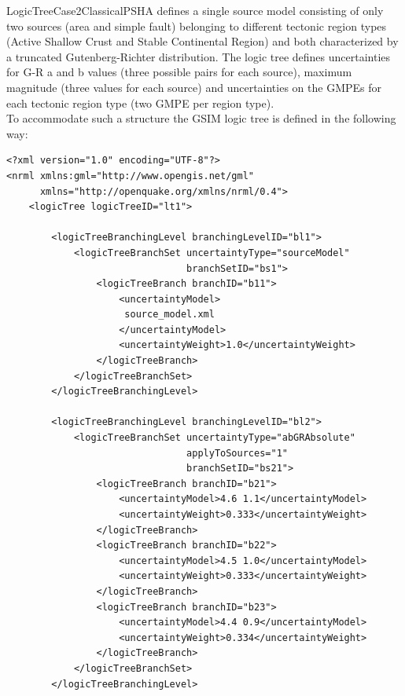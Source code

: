 LogicTreeCase2ClassicalPSHA defines a single source model consisting of 
only two sources (area and simple fault) belonging to different
tectonic region types (Active Shallow Crust and Stable Continental Region) 
and both characterized by a truncated Gutenberg-Richter distribution.
The logic tree defines uncertainties for G-R a and b values (three possible
pairs for each source), maximum magnitude (three values for each source) 
and uncertainties on the GMPEs for each tectonic region type (two GMPE per 
region type).\\
To accommodate such a structure the GSIM logic tree is defined in the
following way:
\begin{Verbatim}[frame=single, commandchars=\\\{\}, fontsize=\normalsize]
<?xml version="1.0" encoding="UTF-8"?>
<nrml xmlns:gml="http://www.opengis.net/gml"
      xmlns="http://openquake.org/xmlns/nrml/0.4">
    <logicTree logicTreeID="lt1">

        <logicTreeBranchingLevel branchingLevelID="bl1">
            <logicTreeBranchSet uncertaintyType="sourceModel"
                                branchSetID="bs1">
                <logicTreeBranch branchID="b11">
                    <uncertaintyModel>
                     source_model.xml
                    </uncertaintyModel>
                    <uncertaintyWeight>1.0</uncertaintyWeight>
                </logicTreeBranch>
            </logicTreeBranchSet>
        </logicTreeBranchingLevel>

        <logicTreeBranchingLevel branchingLevelID="bl2">
            <logicTreeBranchSet uncertaintyType="abGRAbsolute"
                                applyToSources="1"
                                branchSetID="bs21">
                <logicTreeBranch branchID="b21">
                    <uncertaintyModel>4.6 1.1</uncertaintyModel>
                    <uncertaintyWeight>0.333</uncertaintyWeight>
                </logicTreeBranch>
                <logicTreeBranch branchID="b22">
                    <uncertaintyModel>4.5 1.0</uncertaintyModel>
                    <uncertaintyWeight>0.333</uncertaintyWeight>
                </logicTreeBranch>
                <logicTreeBranch branchID="b23">
                    <uncertaintyModel>4.4 0.9</uncertaintyModel>
                    <uncertaintyWeight>0.334</uncertaintyWeight>
                </logicTreeBranch>
            </logicTreeBranchSet>
        </logicTreeBranchingLevel>


\end{Verbatim}
